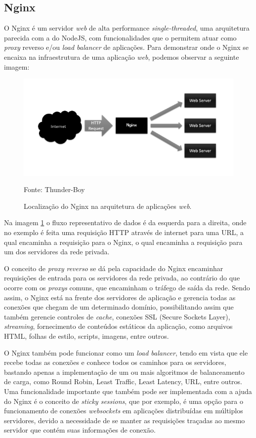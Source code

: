 \subsection{Nginx}
O Nginx \cite{nginx} é um servidor \textit{web} de alta performance \textit{single-threaded}, uma arquitetura parecida com a do NodeJS, com funcionalidades que o permitem atuar como \textit{proxy} reverso e/ou \textit{load balancer} de aplicações. Para demonstrar onde o Nginx se encaixa na infraestrutura de uma aplicação \textit{web}, podemos observar a seguinte imagem:

\begin{figure}[H]
	\centering
	\includegraphics[scale=1]{imagens/nginx.png}
	\caption{\small Localização do Nginx na arquitetura de aplicações \textit{web}.} Fonte: Thunder-Boy \cite{img-nginx}
	\label{fig:nginx}
\end{figure}

Na imagem \ref{fig:nginx} o fluxo representativo de dados é da esquerda para a direita, onde no exemplo é feita uma requisição HTTP através de internet para uma URL, a qual encaminha a requisição para o Nginx, o qual encaminha a requisição para um dos servidores da rede privada.

O conceito de \textit{proxy reverso} se dá pela capacidade do Nginx encaminhar requisições de entrada para os servidores da rede privada, ao contrário do que ocorre com os \textit{proxys} comuns, que encaminham o tráfego de saída da rede. Sendo assim, o Nginx está na frente dos servidores de aplicação e gerencia todas as conexões que chegam de um determinado domínio, possibilitando assim que também gerencie controles de \textit{cache}, conexões SSL (Secure Sockets Layer), \textit{streaming}, fornecimento de conteúdos estáticos da aplicação, como arquivos HTML, folhas de estilo, scripts, imagens, entre outros.

O Nginx também pode funcionar como um \textit{load balancer}, tendo em vista que ele recebe todas as conexões e conhece todos os caminhos para os servidores, bastando apenas a implementação de um ou mais algoritmos de balanceamento de carga, como Round Robin, Least Traffic, Least Latency, URL, entre outros. Uma funcionalidade importante que também pode ser implementada com a ajuda do Nginx é o conceito de \textit{sticky sessions}, que por exemplo, é uma opção para o funcionamento de conexões \textit{websockets} em aplicações distribuídas em múltiplos servidores, devido a necessidade de se manter as requisições traçadas ao mesmo servidor que contém suas informações de conexão.